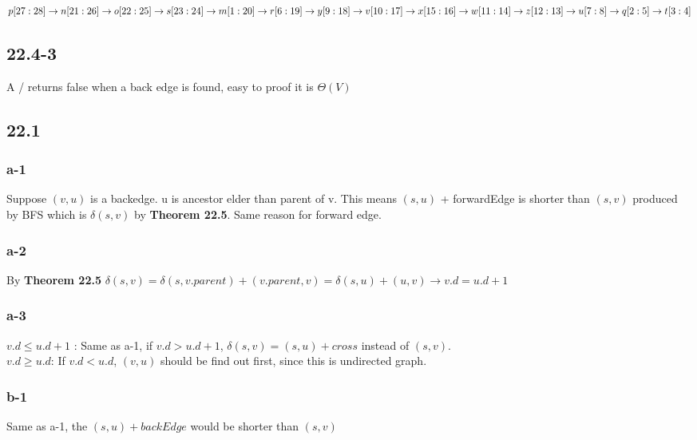 \documentclass[]{article}
\begin{document}
$ p[27:28] \rightarrow n[21:26] \rightarrow o[22:25] \rightarrow s[23:24] \rightarrow\\
 m[1:20] \rightarrow r[6:19] \rightarrow y[9:18] \rightarrow v[10:17] \rightarrow x[15:16] \rightarrow \\
w[11:14] \rightarrow z[12:13] \rightarrow u[7:8] \rightarrow q[2:5] \rightarrow t[3:4]$

\subsection{22.4-3}
A / returns false when a back edge is found, easy to proof it is $\Theta (V)$

\subsection{22.1}
\subsubsection{a-1}

Suppose $(v,u)$ is a backedge. u is ancestor elder than parent of v. This means $(s,u)$ + forwardEdge is shorter than $(s,v)$ produced by BFS which is $\delta(s,v)$ by \textbf{Theorem 22.5}. Same reason for forward edge.   

\subsubsection{a-2}

By \textbf{Theorem 22.5} $\delta(s,v) = \delta(s,v.parent) + (v.parent, v) = \delta(s,u) + (u,v) \rightarrow v.d = u.d + 1$

\subsubsection{a-3}

$v.d \le u.d + 1$ : Same as a-1, if $v.d > u.d + 1$, $\delta(s,v) = (s,u) + cross$ instead of $(s,v)$. \\
$v.d \ge u.d$: If $v.d < u.d$, $(v,u)$ should be find out first, since this is undirected graph. 

\subsubsection{b-1}

Same as a-1, the $(s, u) + backEdge$ would be shorter than $(s, v)$
\end{document}
